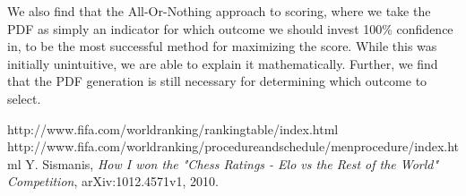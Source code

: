 \documentclass{llncs}
\begin{document}
We also find that the All-Or-Nothing approach to scoring, where we take the PDF as simply an indicator for which outcome we should invest 100\% confidence in, to be the most successful method for maximizing the score. While this was initially unintuitive, we are able to explain it mathematically. Further, we find that the PDF generation is still necessary for determining which outcome to select.

\begin{thebibliography}{7}
  http://www.fifa.com/worldranking/rankingtable/index.html
  http://www.fifa.com/worldranking/procedureandschedule/menprocedure/index.html
  Y. Sismanis, \emph{How I won the "Chess Ratings - Elo vs the Rest of the World" Competition}, arXiv:1012.4571v1, 2010.
\end{thebibliography}
\end{document}
